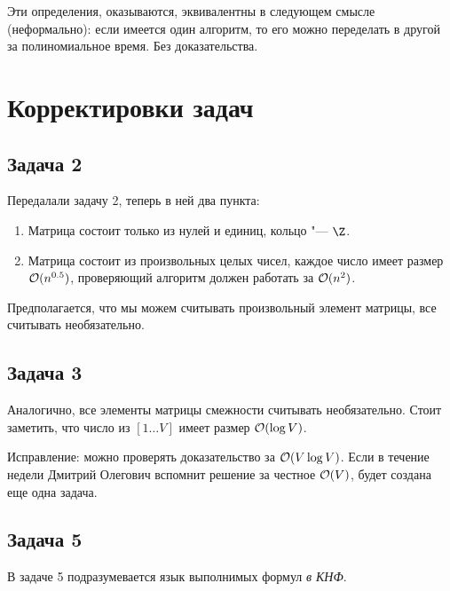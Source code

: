 \begin{Rem}
	Эти определения, оказываются, эквивалентны в следующем смысле (неформально):
	если имеется один алгоритм, то его можно переделать в другой за полиномиальное время.
	Без доказательства.
\end{Rem}

\section{Корректировки задач}
\subsection{Задача 2}
	Передалали задачу 2, теперь в ней два пункта:
	\begin{enumerate}
		\item Матрица состоит только из нулей и единиц, кольцо "--- $\Z$.
		\item
			Матрица состоит из произвольных целых чисел, каждое число имеет размер $\mathcal O(n^{0.5})$,
			проверяющий алгоритм должен работать за $\mathcal O(n^2)$.
	\end{enumerate}
	Предполагается, что мы можем считывать произвольный элемент матрицы, все считывать необязательно.

\subsection{Задача 3}
	Аналогично, все элементы матрицы смежности считывать необязательно.
	Стоит заметить, что число из $[1\dots V]$ имеет размер $\mathcal O(\log V)$.

	Исправление: можно проверять доказательство за $\mathcal O(V \log V)$.
	Если в течение недели Дмитрий Олегович вспомнит решение за честное $\mathcal O(V)$, будет создана еще одна задача.

\subsection{Задача 5}
	В задаче 5 подразумевается язык выполнимых формул \textit{в КНФ}.
